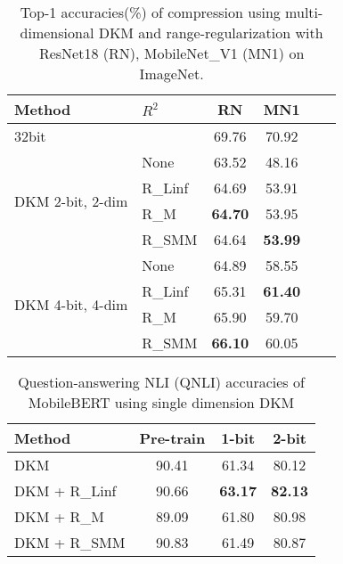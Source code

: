 \documentclass[10pt,twocolumn,letterpaper]{article}
\begin{document}
\begin{table}[t]
\caption{Top-1 accuracies(\%) of compression using multi-dimensional DKM and range-regularization with ResNet18 (RN), MobileNet\_V1 (MN1) on ImageNet.} \label{table_comp_exp_multi}
\vskip 0.15in
\begin{center}
\begin{small}
\begin{sc}
\begin{tabular}{llcccc}
\toprule
Method & $R^{2}$ & RN & MN1 \\
\midrule
32bit &   & 69.76 & 70.92 \\
\midrule
\multirow{4}{*}{DKM 2-bit, 2-dim}    & None        & 63.52 & 48.16 \\
                        & R\_Linf    & 64.69 & 53.91 \\
                        & R\_M    &  \textbf{64.70} & 53.95\\
                        & R\_SMM    & 64.64 & \textbf{53.99}\\
                        \midrule
\multirow{4}{*}{DKM 4-bit, 4-dim}    & None        & 64.89 & 58.55\\
                        & R\_Linf    & 65.31 & \textbf{61.40}\\
                        & R\_M    & 65.90 & 59.70\\
                        & R\_SMM    & \textbf{66.10} & 60.05 \\
\bottomrule
\end{tabular}
\end{sc}
\end{small}
\end{center}
\vskip -0.1in
\end{table}









\begin{table}[t]
\caption{Question-answering NLI (QNLI) accuracies of MobileBERT using single dimension DKM}
\label{exp_mobilebert}
\vskip 0.15in
\begin{center}
\begin{small}
\begin{sc}
\begin{tabular}{lccc}
\toprule
Method &Pre-train & 1-bit & 2-bit \\
\midrule
DKM    & 90.41 & 61.34 & 80.12 \\
DKM + R\_Linf  & 90.66 & \textbf{63.17} & \textbf{82.13}        \\
DKM + R\_M  & 89.09 & 61.80 & 80.98        \\
DKM + R\_SMM & 90.83 & 61.49 & 80.87        \\
\bottomrule
\end{tabular}
\end{sc}
\end{small}
\end{center}
\vskip -0.1in
\end{table}
\end{document}
